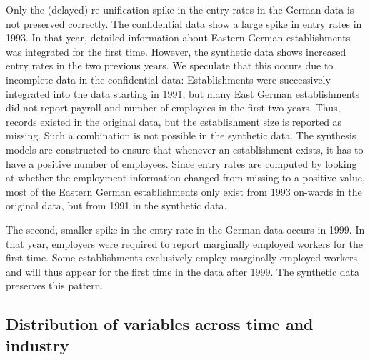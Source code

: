Only the (delayed) re-unification spike in the entry rates in the German data is not preserved correctly. The confidential data show a large spike in entry rates in 1993. In that year, detailed information about Eastern German establishments was integrated for the first time. However, the synthetic data shows increased entry rates in the two previous years. We speculate that this occurs due to incomplete data in the confidential data: Establishments were successively integrated into the data starting in 1991, but  many East German establishments did not report payroll and number of employees  in the first two years. Thus, records existed in the original data, but the establishment size is reported as missing. Such a combination is not possible in the synthetic data. The synthesis models are constructed to ensure that whenever an establishment exists, it has to have a positive number of employees. Since entry rates are computed by looking at whether the employment information changed from missing to a positive value, most of the Eastern German establishments only exist from 1993 on-wards in the original data, but from 1991 in the synthetic data.

The second, smaller spike in the entry rate in the German data occurs in 1999. In that year, employers were required to report  marginally employed workers  for the first time. Some establishments exclusively employ marginally employed workers, and will thus appear for the first time in the data after 1999. The synthetic data preserves this pattern. 



%
%
%
%






\subsection{Distribution of variables across time and industry}



